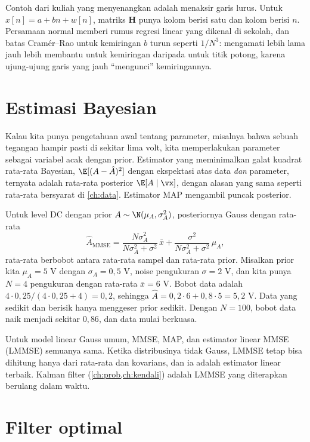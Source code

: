 Contoh dari kuliah yang menyenangkan adalah menaksir garis lurus. Untuk $x[n]=a+bn+w[n]$, matriks
$\bm H$ punya kolom berisi satu dan kolom berisi $n$. Persamaan normal memberi rumus regresi linear yang
dikenal di sekolah, dan batas Cramér--Rao untuk kemiringan $b$ turun seperti $1/N^3$: mengamati lebih lama
jauh lebih membantu untuk kemiringan daripada untuk titik potong, karena ujung-ujung garis yang jauh
``mengunci'' kemiringannya.

\section{Estimasi Bayesian}

Kalau kita punya pengetahuan awal tentang parameter, misalnya bahwa sebuah tegangan hampir pasti di
sekitar lima volt, kita memperlakukan parameter sebagai variabel acak dengan prior. Estimator yang
meminimalkan galat kuadrat rata-rata Bayesian, $\E[(A-\hat A)^2]$ dengan ekspektasi atas data \emph{dan}
parameter, ternyata adalah rata-rata posterior $\E[A\mid\vx]$, dengan alasan yang sama seperti rata-rata
bersyarat di \cref{ch:data}. Estimator MAP mengambil puncak posterior.

Untuk level DC dengan prior $A\sim\N(\mu_A,\sigma_A^2)$, posteriornya Gauss dengan rata-rata
\begin{equation}
\hat A_{\mathrm{MMSE}}=\frac{N\sigma_A^2}{N\sigma_A^2+\sigma^2}\,\bar x+\frac{\sigma^2}{N\sigma_A^2+\sigma^2}\,\mu_A,
\end{equation}
rata-rata berbobot antara rata-rata sampel dan rata-rata prior. Misalkan prior kita $\mu_A=5$ V dengan
$\sigma_A=0{,}5$ V, noise pengukuran $\sigma=2$ V, dan kita punya $N=4$ pengukuran dengan rata-rata
$\bar x=6$ V. Bobot data adalah $4\cdot0{,}25/(4\cdot0{,}25+4)=0{,}2$, sehingga $\hat A=0{,}2\cdot6+0{,}8\cdot5=5{,}2$ V.
Data yang sedikit dan berisik hanya menggeser prior sedikit. Dengan $N=100$, bobot data naik menjadi
sekitar $0{,}86$, dan data mulai berkuasa.

Untuk model linear Gauss umum, MMSE, MAP, dan estimator linear MMSE (LMMSE) semuanya sama. Ketika
distribusinya tidak Gauss, LMMSE tetap bisa dihitung hanya dari rata-rata dan kovarians, dan ia adalah
estimator linear terbaik. Kalman filter (\cref{ch:prob,ch:kendali}) adalah LMMSE yang diterapkan berulang
dalam waktu.

\section{Filter optimal}

